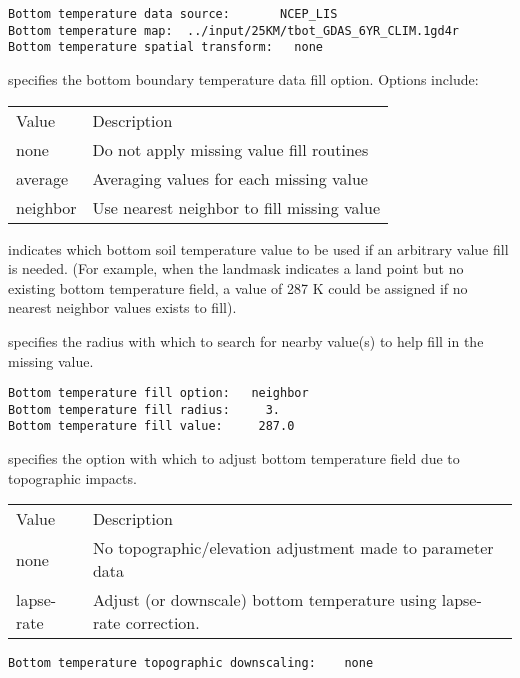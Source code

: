  \begin{Verbatim}[frame=single]
Bottom temperature data source:       NCEP_LIS
Bottom temperature map:  ../input/25KM/tbot_GDAS_6YR_CLIM.1gd4r
Bottom temperature spatial transform:   none
 \end{Verbatim}

 
  specifies the bottom boundary
 temperature data fill option.  Options include:

 \begin{tabular}{ll}
 Value    & Description                                \\
 none     & Do not apply missing value fill routines   \\
 average  & Averaging values for each missing value    \\
 neighbor & Use nearest neighbor to fill missing value \\
 \end{tabular}

  indicates which bottom soil 
 temperature value to be used if an arbitrary value fill is needed. 
 (For example, when the landmask indicates a land point but no existing 
 bottom temperature field, a value of 287 K could be assigned if 
 no nearest neighbor values exists to fill).

  specifies the radius with which
 to search for nearby value(s) to help fill in the missing value.
 

 \begin{Verbatim}[frame=single]
Bottom temperature fill option:   neighbor    
Bottom temperature fill radius:     3.      
Bottom temperature fill value:     287.0      
 \end{Verbatim}

 
  specifies the
 option with which to adjust bottom temperature field due to
 topographic impacts.

 \begin{tabular}{ll}
 Value       & Description                  \\
 none        & No topographic/elevation adjustment made to 
               parameter data \\
 lapse-rate  & Adjust (or downscale) bottom temperature using
               lapse-rate correction. \\
 \end{tabular}
 

 \begin{Verbatim}[frame=single]
Bottom temperature topographic downscaling:    none
 \end{Verbatim}

